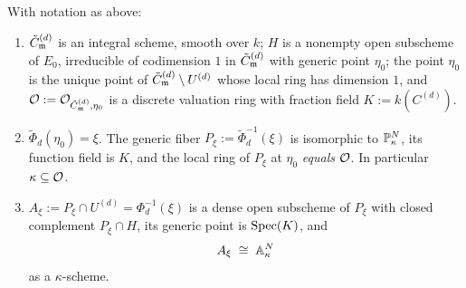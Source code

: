 \begin{lemma}\label{lemma:boundary_generic_fiber_short}
    With notation as above:
    \begin{enumerate}
        \item $\tilde{C}_{\mathfrak{m}}^{(d)}$ is an integral scheme, smooth over $k$; $H$ is a nonempty open
              subscheme of $E_0$, irreducible of codimension $1$ in $\tilde{C}_{\mathfrak{m}}^{(d)}$ with generic
              point $\eta_0$; the point $\eta_0$ is the unique point of
              $\tilde{C}_{\mathfrak{m}}^{(d)} \setminus U^{(d)}$ whose local ring has dimension $1$, and
              $\mathcal{O} := \mathcal{O}_{\tilde{C}_{\mathfrak{m}}^{(d)}, \eta_0}$ is a discrete valuation ring with fraction
              field $K := k(C^{(d)})$.
        \item $\tilde{\Phi}_d(\eta_0) = \xi$. The generic fiber
              $P_\xi := \tilde{\Phi}_d^{-1}(\xi)$ is isomorphic to $\mathbb{P}^N_\kappa$, its
              function field is $K$, and the local ring of $P_\xi$ at $\eta_0$ \emph{equals}
              $\mathcal{O}$. In particular $\kappa \subseteq \mathcal{O}$.
        \item $A_\xi := P_\xi \cap U^{(d)} = \Phi_d^{-1}(\xi)$ is a dense open subscheme of
              $P_\xi$ with closed complement $P_\xi \cap H$, its generic point is
              $\operatorname{Spec}(K)$, and
              \[ A_\xi \;\cong\; \mathbb{A}^N_\kappa \]
              as a $\kappa$-scheme.
    \end{enumerate}
\end{lemma}
